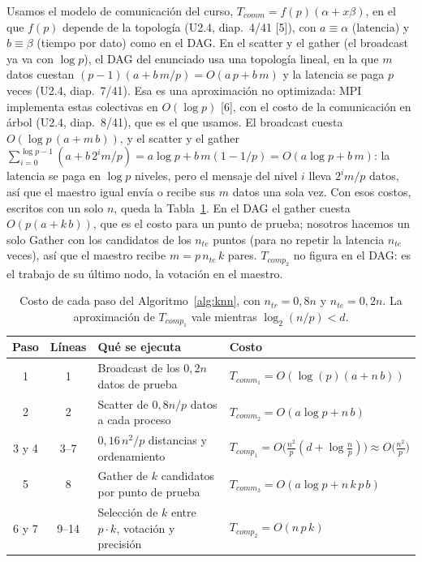 \documentclass[11pt,a4paper]{article}
\newcommand{\ntr}{n_{tr}}
\newcommand{\nte}{n_{te}}
\begin{document}
Usamos el modelo de comunicación del curso, $T_{comm} = f(p)(\alpha + x\beta)$, en el que $f(p)$ depende de la topología (U2.4, diap.~4/41 [5]), con $a \equiv \alpha$ (latencia) y $b \equiv \beta$ (tiempo por dato) como en el DAG. En el scatter y el gather (el broadcast ya va con $\log p$), el DAG del enunciado usa una topología lineal, en la que $m$ datos cuestan $(p-1)(a + b\,m/p) = O(a\,p + b\,m)$ y la latencia se paga $p$ veces (U2.4, diap.~7/41). Esa es una aproximación no optimizada: MPI implementa estas colectivas en $O(\log p)$ [6], con el costo de la comunicación en árbol (U2.4, diap.~8/41), que es el que usamos. El broadcast cuesta $O(\log p\,(a + m\,b))$, y el scatter y el gather $\sum_{i=0}^{\log p-1}(a + b\,2^i m/p) = a\log p + b\,m(1-1/p) = O(a\log p + b\,m)$: la latencia se paga en $\log p$ niveles, pero el mensaje del nivel $i$ lleva $2^i m/p$ datos, así que el maestro igual envía o recibe sus $m$ datos una sola vez. Con esos costos, escritos con un solo $n$, queda la Tabla~\ref{tab:pasos}. En el DAG el gather cuesta $O(p(a + k\,b))$, que es el costo para un punto de prueba; nosotros hacemos un solo Gather con los candidatos de los $\nte$ puntos (para no repetir la latencia $\nte$ veces), así que el maestro recibe $m = p\,\nte\,k$ pares. $T_{comp_2}$ no figura en el DAG: es el trabajo de su último nodo, la votación en el maestro.

\begin{table}[!htb]
\centering
\small
\renewcommand{\arraystretch}{1.2}
\begin{tabular}{c c >{\raggedright\arraybackslash}p{5.2cm} l}
\toprule
\textbf{Paso} & \textbf{Líneas} & \textbf{Qué se ejecuta} & \textbf{Costo} \\
\midrule
1 & 1 & Broadcast de los $0{,}2n$ datos de prueba & $T_{comm_1} = O(\log(p)(a + n\, b))$ \\
2 & 2 & Scatter de $0{,}8n/p$ datos a cada proceso & $T_{comm_2} = O(a\log p + n\, b)$ \\
3 y 4 & 3--7 & $0{,}16\,n^2/p$ distancias y ordenamiento & $T_{comp_1} = O\big(\frac{n^2}{p}(d + \log \frac{n}{p})\big) \approx O\big(\frac{n^2}{p}\big)$ \\
5 & 8 & Gather de $k$ candidatos por punto de prueba & $T_{comm_3} = O(a\log p + n\, k\, p\, b)$ \\
6 y 7 & 9--14 & Selección de $k$ entre $p \cdot k$, votación y precisión & $T_{comp_2} = O(n\, p\, k)$ \\
\bottomrule
\end{tabular}
\caption{Costo de cada paso del Algoritmo~\ref{alg:knn}, con $\ntr = 0{,}8n$ y $\nte = 0{,}2n$. La aproximación de $T_{comp_1}$ vale mientras $\log_2(n/p) < d$.}
\label{tab:pasos}
\end{table}
\end{document}
